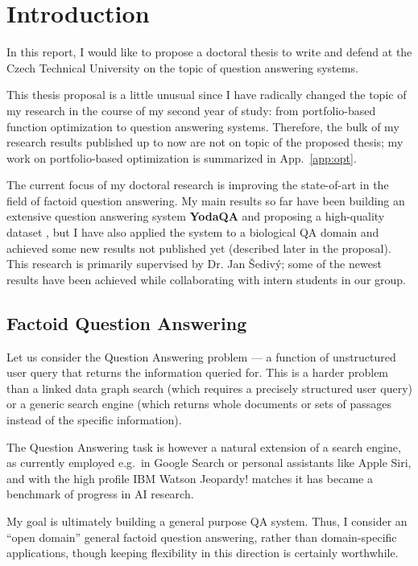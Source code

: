 \chapter{Introduction}
\label{ch:intro}

In this report, I would like to propose a doctoral thesis to write
and defend at the Czech Technical University on the topic of question
answering systems.

This thesis proposal is a little unusual since I have radically changed
the topic of my research in the course of my second year of study:
from portfolio-based function optimization to question answering systems.
Therefore, the bulk of my research results published up to now are not
on topic of the proposed thesis; my work on portfolio-based optimization
is summarized in App.~\ref{app:opt}.

The current focus of my doctoral research
is improving the state-of-art in the field of factoid question answering.
My main results so far have been
building an extensive question answering system \textbf{YodaQA} \citep{YodaQAPoster2015}
and proposing a high-quality dataset \citep{YodaQACLEF2015},
but I have also applied the system to a biological QA domain \citep{YodaQABioASQ2015}
and achieved some new results not published yet (described later in the proposal).
This research is primarily supervised by Dr. Jan Šedivý;
some of the newest results have been achieved while collaborating
with intern students in our group.

\section{Factoid Question Answering}

Let us consider the Question Answering problem --- a function of
unstructured user query that returns the information queried for.
This is a harder problem than a linked data graph search (which requires
a precisely structured user query) or a generic search engine (which
returns whole documents or sets of passages instead of the specific
information).

The Question Answering task is however a natural extension of a search
engine, as currently employed e.g.\ in Google Search \citep{googleKG}
or personal assistants like Apple Siri, and with the high
profile IBM Watson Jeopardy! matches \citep{WatsonOverview}
it has became a benchmark of progress in AI research.

My goal is ultimately building a general purpose QA system.
Thus, I consider an ``open domain'' general factoid question answering,
rather than domain-specific applications, though keeping flexibility
in this direction is certainly worthwhile.

